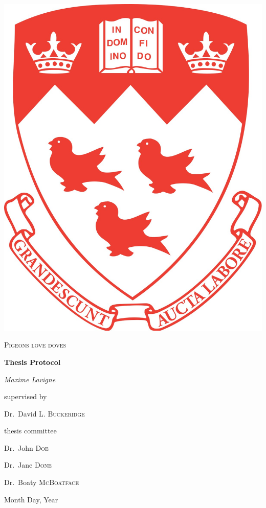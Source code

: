 \AtBeginShipoutNext{\AtBeginShipoutNext{\AtBeginShipoutDiscard}}
\begin{titlingpage}

\begin{minipage}[c]{0.23\textwidth}
\raggedright 
\includegraphics[width=0.75\linewidth]{coa.jpg}
\end{minipage}%
\vrule width 2pt
\begin{minipage}[c]{0.73\textwidth}
	\centering
	
	\vspace{5cm}
	{\huge\scshape Pigeons love doves\par}
	
	\vspace{2cm}
	{\Large\bfseries Thesis Protocol\par}
	
	\vspace{2cm}
	{\Large\itshape Maxime Lavigne\par}
	
	\vspace{2cm}
	supervised by\par
	Dr.~David L. \textsc{Buckeridge}
	
	\vspace{2cm}
	thesis committee\par
	Dr.~John \textsc{Doe}\par
	Dr.~Jane \textsc{Done}\par
	Dr.~Boaty \textsc{McBoatface}

	\vspace{5cm}
	{\large Month Day, Year\par}
\end{minipage}%

\end{titlingpage}